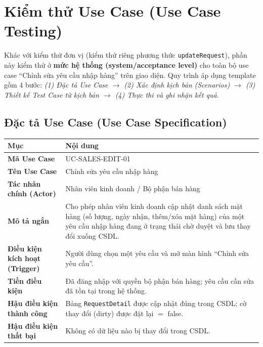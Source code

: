 \documentclass[12pt,a4paper]{article}
\begin{document}
\section{Kiểm thử Use Case (Use Case Testing)}

Khác với kiểm thử đơn vị (kiểm thử riêng phương thức \texttt{updateRequest}), phần này kiểm thử ở \textbf{mức hệ thống (system/acceptance level)} cho toàn bộ use case ``Chỉnh sửa yêu cầu nhập hàng'' trên giao diện. Quy trình áp dụng template gồm 4 bước: \emph{(1) Đặc tả Use Case $\to$ (2) Xác định kịch bản (Scenarios) $\to$ (3) Thiết kế Test Case từ kịch bản $\to$ (4) Thực thi và ghi nhận kết quả.}

\subsection{Đặc tả Use Case (Use Case Specification)}
\begin{table}[H]
\centering
\small
\begin{tabularx}{\textwidth}{|>{\bfseries}p{4.2cm}|Y|}
\hline
{}\normalfont\textbf{Mục} & \textbf{Nội dung}\\ \hline
Mã Use Case & UC-SALES-EDIT-01\\ \hline
Tên Use Case & Chỉnh sửa yêu cầu nhập hàng\\ \hline
Tác nhân chính (Actor) & Nhân viên kinh doanh / Bộ phận bán hàng\\ \hline
Mô tả ngắn & Cho phép nhân viên kinh doanh cập nhật danh sách mặt hàng (số lượng, ngày nhận, thêm/xóa mặt hàng) của một yêu cầu nhập hàng đang ở trạng thái chờ duyệt và lưu thay đổi xuống CSDL.\\ \hline
Điều kiện kích hoạt (Trigger) & Người dùng chọn một yêu cầu và mở màn hình ``Chỉnh sửa yêu cầu''.\\ \hline
Tiền điều kiện & Đã đăng nhập với quyền bộ phận bán hàng; yêu cầu cần sửa đã tồn tại trong hệ thống.\\ \hline
Hậu điều kiện thành công & Bảng \texttt{RequestDetail} được cập nhật đúng trong CSDL; cờ thay đổi (dirty) được đặt lại $=$ false.\\ \hline
Hậu điều kiện thất bại & Không có dữ liệu nào bị thay đổi trong CSDL.\\ \hline
\end{tabularx}
\end{table}
\end{document}
